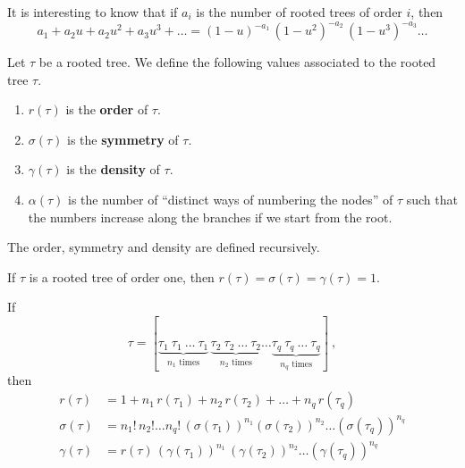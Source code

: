 \begin{rmk}
It is interesting to know that if $a_i$ is the number of rooted trees
of order $i$, then
\[
a_1 + a_2 u + a_2 u^2 + a_3 u^3+ \ldots =
(1-u)^{-a_1}\,(1-u^2)^{-a_2}\,(1-u^3)^{-a_3} \ldots
\]
\label{CombTree}
\end{rmk}

\begin{defn}
Let $\tau$ be a rooted tree.  We define the following values associated to
the rooted tree $\tau$.
\begin{enumerate}
\item $r(\tau)$ is the {\bfseries order} of $\tau$.
\item $\sigma(\tau)$ is the {\bfseries symmetry} of $\tau$. 
\item $\gamma(\tau)$ is the {\bfseries density} of $\tau$. 
\item $\alpha(\tau)$ is the number of ``distinct ways of
numbering the nodes'' of $\tau$ such that the numbers increase along the
branches if we start from the root.
\end{enumerate}
The order, symmetry and density are defined recursively.

If $\tau$ is a rooted tree of order one, then
$r(\tau) = \sigma(\tau) = \gamma(\tau) = 1$.

If
\[
\tau = [\underbrace{\tau_1\ \tau_1\ \ldots\ \tau_1}_{\text{$n_1$ times}}
\,\underbrace{\tau_2\ \tau_2\ \ldots\ \tau_2}_{\text{$n_2$ times}}
\ldots
\underbrace{\tau_q\ \tau_q\ \ldots\ \tau_q}_{\text{$n_q$ times}}] \ ,
\]
then
\begin{align*}
r(\tau) &= 1 + n_1 \,r(\tau_1) + n_2 \,r(\tau_2) + \ldots +
n_q \,r(\tau_q) \\
\sigma(\tau) &= n_1!\,n_2!\dots n_q!\,(\sigma(\tau_1))^{n_1}
(\sigma(\tau_2))^{n_2}\ldots (\sigma(\tau_q))^{n_q} \\
\gamma(\tau) &= r(\tau)\,(\gamma(\tau_1))^{n_1} \,
(\gamma(\tau_2))^{n_2}\ldots (\gamma(\tau_q))^{n_q}
\end{align*}
\end{defn}

